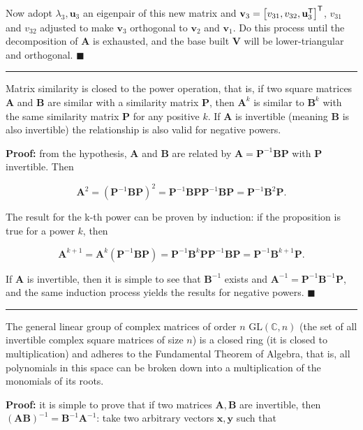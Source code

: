 	Now adopt $\lambda_3, \mathbf{u}_3$ an eigenpair of this new matrix and $\mathbf{v}_3 = \left[v_{31},v_{32},\mathbf{u}_3^{\mathsf{T}}\right]^{\mathsf{T}}$, $v_{31}$ and $v_{32}$ adjusted to make $\mathbf{v}_3$ orthogonal to $\mathbf{v}_2$ and $\mathbf{v}_1$. Do this process until the decomposition of $\mathbf{A}$ is exhausted, and the base built $\mathbf{V}$ will be lower-triangular and orthogonal.
\hfill$\blacksquare$
\vspace{5mm}
\hrule
\vspace{5mm} %
\begin{lemma}\label{lemma:matrix_sim_powers} %
	Matrix similarity is closed to the power operation, that is, if two square matrices $\mathbf{A}$ and $\mathbf{B}$ are similar with a similarity matrix $\mathbf{P}$, then $\mathbf{A}^k$ is similar to $\mathbf{B}^k$ with the same similarity matrix $\mathbf{P}$ for any positive $k$. If $\mathbf{A}$ is invertible (meaning $\mathbf{B}$ is also invertible) the relationship is also valid for negative powers.
\end{lemma}
\noindent\textbf{Proof:}  from the hypothesis, $\mathbf{A}$ and $\mathbf{B}$ are related by $\mathbf{A} = \mathbf{P}^{-1}\mathbf{BP}$ with $\mathbf{P}$ invertible. Then

\begin{equation} \mathbf{A}^2 = \left(\mathbf{P}^{-1}\mathbf{BP}\right)^2 = \mathbf{P}^{-1}\mathbf{BP}\mathbf{P}^{-1}\mathbf{BP} = \mathbf{P}^{-1}\mathbf{B}^2\mathbf{P} .\end{equation}

	The result for the k-th power can be proven by induction: if the proposition is true for a power $k$, then

\begin{equation} \mathbf{A}^{k+1} = \mathbf{A}^k \left(\mathbf{P}^{-1}\mathbf{BP}\right) = \mathbf{P}^{-1}\mathbf{B}^k\mathbf{P} \mathbf{P}^{-1}\mathbf{BP} = \mathbf{P}^{-1}\mathbf{B}^{k+1}\mathbf{P} .\end{equation}

	If $\mathbf{A}$ is invertible, then it is simple to see that $\mathbf{B}^{-1}$ exists and $\mathbf{A}^{-1} = \mathbf{P}^{-1}\mathbf{B}^{-1}\mathbf{P}$, and the same induction process yields the results for negative powers.
\hfill$\blacksquare$
\vspace{5mm}
\hrule
\vspace{5mm} %
\begin{lemma}\label{lemma:gl_fund_algebra} %
	The general linear group of complex matrices of order $n$ $\text{GL}\left(\mathbb{C},n\right)$ (the set of all invertible complex square matrices of size $n$) is a closed ring (it is closed to multiplication) and adheres to the Fundamental Theorem of Algebra, that is, all polynomials in this space can be broken down into a multiplication of the monomials of its roots.
\end{lemma}
\noindent\textbf{Proof:} it is simple to prove that if two matrices $\mathbf{A,B}$ are invertible, then $\left(\mathbf{AB}\right)^{-1} = \mathbf{B}^{-1}\mathbf{A}^{-1}$: take two arbitrary vectors $\mathbf{x,y}$ such that

